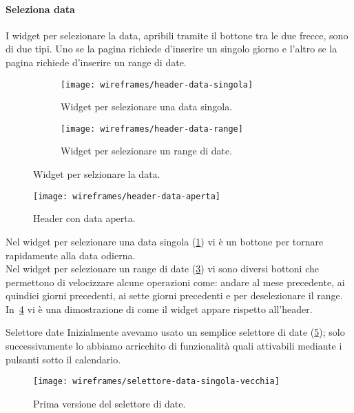 \paragraph{Seleziona data}
I widget per selezionare la data, apribili tramite il bottone tra le due frecce, sono di due tipi. Uno se la pagina richiede  d'inserire un singolo giorno e l'altro se la pagina richiede d'inserire un range di date.\\

\begin{figure}[H]
    \begin{subfigure}[b]{0.5\textwidth}
        \centering
        \texttt{[image: wireframes/header-data-singola]}
        \caption{Widget per selezionare una data singola.}\label{fig:header-data-singola}
    \end{subfigure}
\hfill
    \begin{subfigure}[b]{0.5\textwidth}
        \centering
        \texttt{[image: wireframes/header-data-range]}
        \caption{Widget per selezionare un range di date.}\label{fig:header-data-range}
    \end{subfigure}
    \caption{Widget per selzionare la data.}
\end{figure}

\begin{figure}[H]
    \centering
    \texttt{[image: wireframes/header-data-aperta]}
    \caption{Header con data aperta.}\label{fig:header-data-aperta}
\end{figure}

Nel widget per selezionare una data singola (\ref{fig:header-data-singola}) vi è un bottone per tornare rapidamente alla data odierna.\\
Nel widget per selezionare un range di date (\ref{fig:header-data-range}) vi sono diversi bottoni che permettono di velocizzare alcune operazioni come: andare al mese precedente, ai quindici giorni precedenti, ai sette giorni precedenti e per deselezionare il range.\\
In~\ref{fig:header-data-aperta} vi è una dimostrazione di come il widget appare rispetto all'header.

\begin{bclogo}{Selettore date}
    Inizialmente avevamo usato un semplice selettore di date (\ref{fig:selettore-data-singola-vecchia}); solo successivamente lo abbiamo arricchito di funzionalità quali attivabili mediante i pulsanti sotto il calendario.
\begin{figure}[H]
    \centering
    \texttt{[image: wireframes/selettore-data-singola-vecchia]}
    \caption{Prima versione del selettore di date.}\label{fig:selettore-data-singola-vecchia}
\end{figure}
\end{bclogo}

